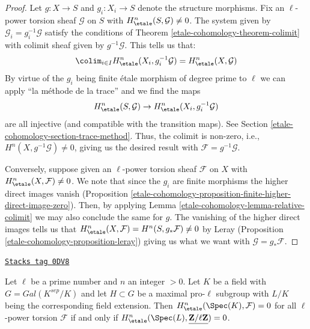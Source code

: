 \begin{proof}
Let $g : X \to S$ and $g_i : X_i \to S$ denote the structure morphisms.
Fix an $\ell$-power torsion sheaf $\mathcal{G}$ on $S$
with $H^n_\etale(S, \mathcal{G}) \not = 0$.
The system given by $\mathcal{G}_i = g_i^{-1}\mathcal{G}$
satisfy the conditions of Theorem \ref{etale-cohomology-theorem-colimit}
with colimit sheaf given by $g^{-1}\mathcal{G}$. This tells
us that:
$$
\colim_{i\in I} H^n_\etale(X_i, g_i^{-1}\mathcal{G}) =
H^n_\etale(X, \mathcal{G})
$$
By virtue of the $g_i$ being finite \'etale morphism of degree prime
to $\ell$ we can apply ``la m\'ethode de la trace'' and we find
the maps
$$
H^n_\etale(S, \mathcal{G}) \to H^n_\etale(X_i, g_i^{-1}\mathcal{G})
$$
are all injective (and compatible with the transition maps).
See Section \ref{etale-cohomology-section-trace-method}. Thus, the colimit is non-zero, i.e.,
$H^n(X,g^{-1}\mathcal{G}) \neq 0$, giving us the desired result with
$\mathcal{F} = g^{-1}\mathcal{G}$.

\medskip\noindent
Conversely, suppose given an $\ell$-power torsion sheaf $\mathcal{F}$ on $X$
with $H^n_\etale(X, \mathcal{F}) \not = 0$. We note that since the $g_i$
are finite morphisms the higher direct images vanish
(Proposition \ref{etale-cohomology-proposition-finite-higher-direct-image-zero}).
Then, by applying Lemma \ref{etale-cohomology-lemma-relative-colimit}
we may also conclude the  same for $g$.
The vanishing of the higher direct images tells us that
$H^n_\etale(X, \mathcal{F}) = H^n(S, g_*\mathcal{F}) \neq 0$
by Leray (Proposition \ref{etale-cohomology-proposition-leray})
giving us what we want with $\mathcal{G} = g_*\mathcal{F}$.
\end{proof}

\begin{lemma}
\label{etale-cohomology-lemma-reduce-to-l-group}
\href{https://stacks.math.columbia.edu/tag/0DV8}{\texttt{Stacks tag 0DV8}}

Let $\ell$ be a prime number and $n$ an integer $> 0$.
Let $K$ be a field with $G = Gal(K^{sep}/K)$ and let
$H \subset G$ be a maximal pro-$\ell$ subgroup with $L/K$
being the corresponding field extension. Then
$H^n_\etale(\Spec(K), \mathcal{F}) = 0$ for all
$\ell$-power torsion $\mathcal{F}$ if and only if
$H^n_\etale(\Spec(L), \underline{\mathbf{Z}/\ell\mathbf{Z}}) = 0$.
\end{lemma}

